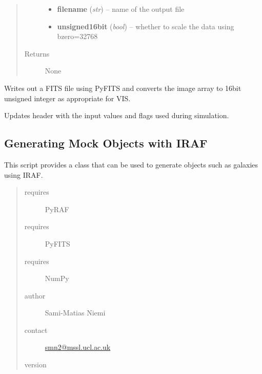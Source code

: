 \documentclass[a4paper,11pt,english]{sphinxmanual}
\begin{document}
\begin{fulllineitems}
\begin{fulllineitems}
\begin{quote}
\begin{description}
\begin{itemize}
\item {} 
\textbf{filename} (\emph{str}) -- name of the output file

\item {} 
\textbf{unsigned16bit} (\emph{bool}) -- whether to scale the data using bzero=32768

\end{itemize}

\item[{Returns}] \leavevmode
None

\end{description}\end{quote}

\end{fulllineitems}


\begin{fulllineitems}
\label{simulator:simulator.simulator.VISsimulator.writeOutputs}
Writes out a FITS file using PyFITS and converts the image array to 16bit unsigned integer as
appropriate for VIS.

Updates header with the input values and flags used during simulation.

\end{fulllineitems}


\end{fulllineitems}

\label{simulator:module-simulator.generateGalaxies}

\subsection{Generating Mock Objects with IRAF}
\label{simulator:generating-mock-objects-with-iraf}
This script provides a class that can be used to generate objects such as galaxies using IRAF.
\begin{quote}\begin{description}
\item[{requires}] \leavevmode
PyRAF

\item[{requires}] \leavevmode
PyFITS

\item[{requires}] \leavevmode
NumPy

\item[{author}] \leavevmode
Sami-Matias Niemi

\item[{contact}] \leavevmode
\href{mailto:smn2@mssl.ucl.ac.uk}{smn2@mssl.ucl.ac.uk}

\item[{version}] 

\end{description}\end{quote}
\end{document}

